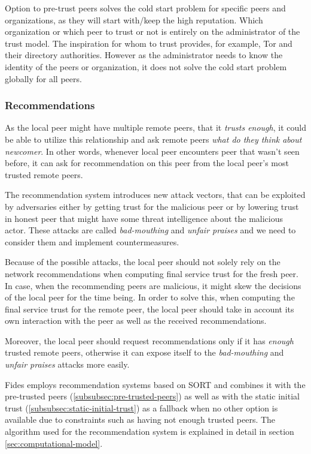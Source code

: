 Option to pre-trust peers solves the cold start problem for specific peers and organizations, as they will start with/keep the high reputation.
Which organization or which peer to trust or not is entirely on the administrator of the trust model. The inspiration for whom to trust provides, for example, Tor and their directory authorities\cite{torauth}. 
However as the administrator needs to know the identity of the peers or organization, it does not solve the cold start problem globally for all peers.

\subsubsection{Recommendations}
\label{subsubsec:recommendations}
As the local peer might have multiple remote peers, that it \textit{trusts enough}, it could be able to utilize this relationship and ask remote peers \textit{what do they think about newcomer}. 
In other words, whenever local peer encounters peer that wasn't seen before, it can ask for recommendation on this peer from the local peer's most trusted remote peers.

The recommendation system introduces new attack vectors, that can be exploited by adversaries either by getting trust for the malicious peer or by lowering trust in honest peer that might have some threat intelligence about the malicious actor. 
These attacks are called \textit{bad-mouthing} and \textit{unfair praises} and we need to consider them and implement countermeasures.

Because of the possible attacks, the local peer should not solely rely on the network recommendations when computing final service trust for the fresh peer. In case, when the recommending peers are malicious, it might skew the decisions of the local peer for the time being.
In order to solve this, when computing the final service trust for the remote peer, the local peer should take in account its own interaction with the peer as well as the received recommendations.

Moreover, the local peer should request recommendations only if it has \textit{enough} trusted remote peers, otherwise it can expose itself to the \textit{bad-mouthing} and \textit{unfair praises} attacks more easily.

\vspace{7mm}

Fides employs recommendation systems based on SORT \cite{sort} and combines it with the pre-trusted peers (\ref{subsubsec:pre-trusted-peers}) as well as with the static initial trust (\ref{subsubsec:static-initial-trust}) as a fallback when no other option is available due to constraints such as having not enough trusted peers.
The algorithm used for the recommendation system is explained in detail in section \ref{sec:computational-model}.